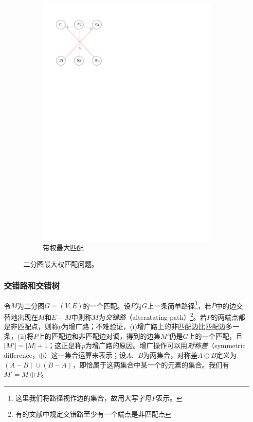 \documentclass[a4paper]{ctexbook}
\begin{document}
\begin{figure}
\begin{subfigure}[t]{0.45\linewidth}
      \includegraphics[scale=0.8]{figures/max-weighted-bipartite-match}
      \caption{带权最大匹配}
    \end{subfigure}
    \caption{二分图最大权匹配问题。}
  \end{figure}
  \subsubsection*{交错路和交错树}
  令$M$为二分图$G=(V,E)$的一个匹配。设$P$为$G$上一条简单路径\footnote{这里我们将路径视作边的集合，故用大写字母$P$表示。}，若$P$中的边交替地出现在$M$和$E-M$中则称$M$为\emph{交错路}（alterntating path）\footnote{有的文献中规定交错路至少有一个端点是非匹配点}。若$P$的两端点都是非匹配点，则称$p$为增广路；不难验证，(i)增广路上的非匹配边比匹配边多一条，(ii)将$P$上的匹配边和非匹配边对调，得到的边集$M'$仍是$G$上的一个匹配，且$|M'|=|M|+1$；这正是称$p$为增广路的原因。增广操作可以用\emph{对称差}（symmetric difference，$\oplus$）这一集合运算来表示；设$A$、$B$为两集合，对称差$A\oplus B$定义为$(A-B)\cup(B-A)$，即恰属于这两集合中某一个的元素的集合。我们有$M'=M\oplus P$。
\end{document}

